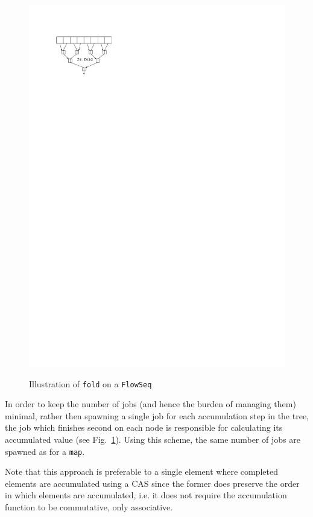 \documentclass[runningheads,a4paper,fleqn]{llncs}
\begin{document}
\begin{figure}
{    \includegraphics{fa-fold-calc}%
    \label{fig:fa-fold-calc}}
  \caption{Illustration of \texttt{fold} on a \texttt{FlowSeq}}
\end{figure}

In order to keep the number of jobs (and hence the burden of managing
them) minimal, rather then spawning a single job for each accumulation
step in the tree, the job which finishes second on each node is
responsible for calculating its accumulated value (see
Fig.~\ref{fig:fa-fold-calc}). Using this scheme, the 
same number of jobs are spawned as for a \texttt{map}.

Note that this approach is preferable to a single element where
completed elements are accumulated using a CAS since the former
does preserve the order in which elements are accumulated, i.e. it
does not require the accumulation function to be commutative, only
associative.
\end{document}
